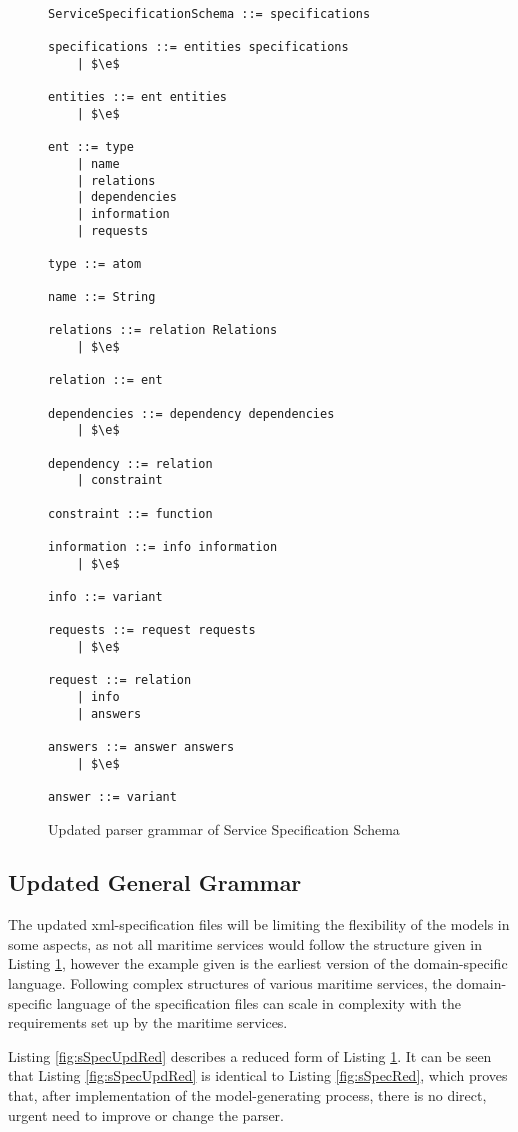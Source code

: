 \begin{figure}
	\centering
	\begin{lstlisting}[keywordstyle={}]
ServiceSpecificationSchema ::= specifications

specifications ::= entities specifications
    | $\e$
     
entities ::= ent entities
    | $\e$

ent ::= type
    | name
    | relations
    | dependencies
    | information
    | requests

type ::= atom

name ::= String

relations ::= relation Relations
    | $\e$

relation ::= ent

dependencies ::= dependency dependencies
    | $\e$

dependency ::= relation
    | constraint

constraint ::= function

information ::= info information
    | $\e$

info ::= variant

requests ::= request requests
    | $\e$

request ::= relation
    | info
    | answers

answers ::= answer answers
    | $\e$

answer ::= variant
	\end{lstlisting}
	\caption{Updated parser grammar of Service Specification Schema}
	\label{fig:sSpecUpd}
\end{figure}
\subsection{Updated General Grammar}
The updated xml-specification files will be limiting the flexibility of the models in some aspects, as not all maritime services would follow the structure given in Listing \ref{fig:sSpecUpd}, however the example given is the earliest version of the domain-specific language. Following complex structures of various maritime services, the domain-specific language of the specification files can scale in complexity with the requirements set up by the maritime services.

Listing \ref{fig:sSpecUpdRed} describes a reduced form of Listing \ref{fig:sSpecUpd}. It can be seen that Listing \ref{fig:sSpecUpdRed} is identical to Listing \ref{fig:sSpecRed}, which proves that, after implementation of the model-generating process, there is no direct, urgent need to improve or change the parser.

